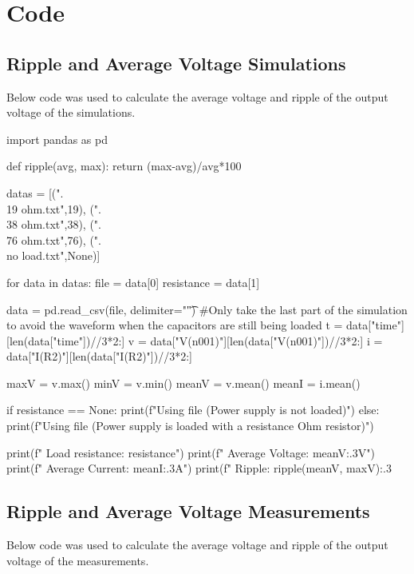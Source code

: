 \chapter{Code}
\label{ch:code}

\section{Ripple and Average Voltage Simulations}
\label{sec:ripvoltcodesim}

Below code was used to calculate the average voltage and ripple of the output voltage of the simulations.

\begin{python}
import pandas as pd

def ripple(avg, max):
    return (max-avg)/avg*100


datas = [(".\\19 ohm.txt",19),
    	(".\\38 ohm.txt",38),
    	(".\\76 ohm.txt",76),
    	(".\\no load.txt",None)]

for data in datas:
    file = data[0]
    resistance = data[1]
    
    data = pd.read_csv(file, delimiter="\t")
    #Only take the last part of the simulation to avoid the waveform when the capacitors are still being loaded
    t = data["time"][len(data["time"])//3*2:]
    v = data["V(n001)"][len(data["V(n001)"])//3*2:]
    i = data["I(R2)"][len(data["I(R2)"])//3*2:]

    maxV = v.max()
    minV = v.min()
    meanV = v.mean()
    meanI = i.mean()
    
    if resistance == None:
        print(f"Using {file} (Power supply is not loaded)")
    else:
        print(f"Using {file} (Power supply is loaded with a {resistance} Ohm resistor)")

    print(f"    Load resistance: {resistance}")   
    print(f"    Average Voltage: {meanV:.3}V")
    print(f"    Average Current: {meanI:.3}A")
    print(f"    Ripple: {ripple(meanV, maxV):.3}%
\end{python}
\newpage
\section{Ripple and Average Voltage Measurements}
\label{sec:ripvoltcodemea}

Below code was used to calculate the average voltage and ripple of the output voltage of the measurements.

